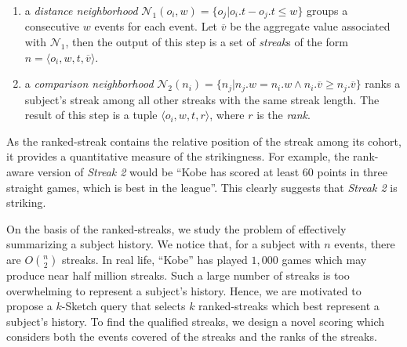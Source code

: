 \begin{enumerate}
\item {a \emph{distance neighborhood} $\mathcal{N}_1(o_i,w)=\{o_j | o_i.t - o_j.t \leq w \}$ groups a consecutive $w$ events for each event. Let $\overline{v}$ be the aggregate value associated with $\mathcal{N}_1$, then the output of this step is a set of \emph{streak}s of the form  $n=\langle o_i, w, t, \overline{v} \rangle$.}
\item {a \emph{comparison neighborhood} $\mathcal{N}_2(n_i) = \{n_j | n_j.w = n_i.w \wedge n_i.\overline{v} \geq n_j.\overline{v} \}$ ranks a subject's streak among all other streaks with the same streak length. The result of this step is a tuple $\langle o_i, w, t, r \rangle$, where $r$ is the \emph{rank}.}
\end{enumerate}
%
%

As the ranked-streak contains the relative position of the streak among its cohort, it provides a quantitative measure of the strikingness.
For example, the rank-aware version of \emph{Streak 2} would be ``Kobe has scored at least 60 points in three straight games, which is best in the league''.  This clearly suggests that \emph{Streak 2} is striking.
%

On the basis of the ranked-streaks, we study the problem of effectively summarizing
a subject history. We notice that, for a subject with $n$ events, there
are $O{n \choose 2}$ streaks. 
In real life, ``Kobe'' has played $1,000$ games which may produce near half million streaks.
Such a large number of streaks is too overwhelming to represent a subject's history. Hence,
we are motivated to propose a $k$-Sketch query that selects $k$ ranked-streaks which best represent
a subject's history. To find the qualified streaks, we design a novel scoring which
considers both the events covered of the streaks and the ranks of the streaks.

